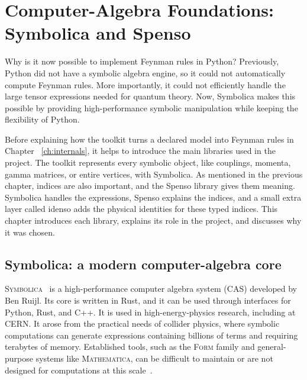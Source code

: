 
\chapter{Computer-Algebra Foundations: Symbolica and Spenso}
\label{ch:cas}
Why is it now possible to implement Feynman rules in Python? Previously, Python did not have a symbolic algebra engine, so it could not automatically compute Feynman rules. More importantly, it could not efficiently handle the large tensor expressions needed for quantum theory. Now, Symbolica makes this possible by providing high-performance symbolic manipulation while keeping the flexibility of Python.

Before explaining how the toolkit turns a declared model into Feynman rules in Chapter ~\ref{ch:internals}, it helps to introduce the main libraries used in the project. The toolkit represents every symbolic object, like couplings, momenta, gamma matrices, or entire vertices, with Symbolica. As mentioned in the previous chapter, indices are also important, and the Spenso library gives them meaning. Symbolica handles the expressions, Spenso explains the indices, and a small extra layer called idenso adds the physical identities for these typed indices. This chapter introduces each library, explains its role in the project, and discusses why it was chosen.




\section{Symbolica: a modern computer-algebra core}
\label{sec:cas-symbolica}

\textsc{Symbolica}~\cite{symbolica} is a high-performance computer algebra system (CAS) developed by Ben Ruijl. Its core is written in Rust, and it can be used through interfaces for Python, Rust, and C++. It is used in high-energy-physics research, including at CERN. It arose from the practical needs of collider physics, where symbolic computations can generate expressions containing billions of terms and requiring terabytes of memory.  Established tools, such as the \textsc{Form} family and general-purpose systems like \textsc{Mathematica}, can be difficult to maintain or are not designed for computations at this scale~\cite{symbolica,ruijl_symbolica_talk}.

